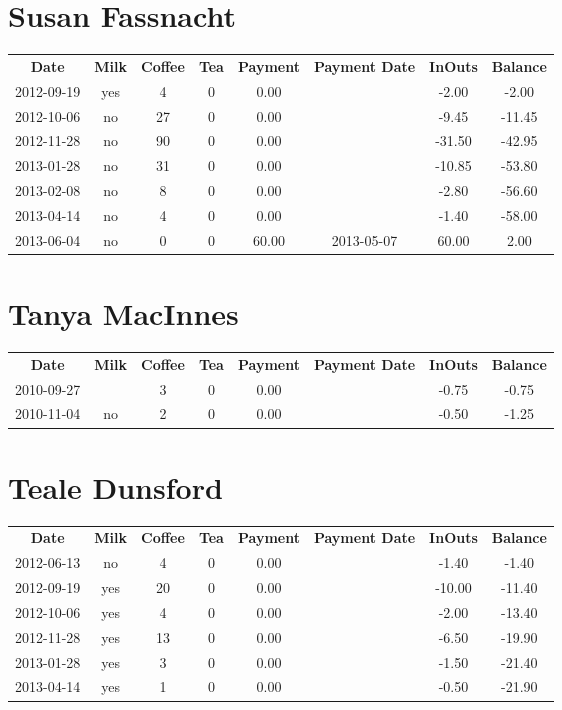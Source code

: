 \section{Susan Fassnacht}

\begin{center}
\begin{tabular}{cccccccc}
\textbf{Date} & \textbf{Milk} & \textbf{Coffee} & \textbf{Tea} & \textbf{Payment} & \textbf{Payment Date} & \textbf{InOuts} & \textbf{Balance} \\
2012-09-19 & yes &  4 & 0 &  0.00 &  &  -2.00 &  -2.00\\ 
2012-10-06 & no & 27 & 0 &  0.00 &  &  -9.45 & -11.45\\ 
2012-11-28 & no & 90 & 0 &  0.00 &  & -31.50 & -42.95\\ 
2013-01-28 & no & 31 & 0 &  0.00 &  & -10.85 & -53.80\\ 
2013-02-08 & no &  8 & 0 &  0.00 &  &  -2.80 & -56.60\\ 
2013-04-14 & no &  4 & 0 &  0.00 &  &  -1.40 & -58.00\\ 
2013-06-04 & no &  0 & 0 & 60.00 & 2013-05-07 &  60.00 &   2.00
\end{tabular}
\end{center}

\section{Tanya MacInnes}

\begin{center}
\begin{tabular}{cccccccc}
\textbf{Date} & \textbf{Milk} & \textbf{Coffee} & \textbf{Tea} & \textbf{Payment} & \textbf{Payment Date} & \textbf{InOuts} & \textbf{Balance} \\
2010-09-27 &  & 3 & 0 & 0.00 &  & -0.75 & -0.75\\ 
2010-11-04 & no & 2 & 0 & 0.00 &  & -0.50 & -1.25
\end{tabular}
\end{center}

\section{Teale Dunsford}

\begin{center}
\begin{tabular}{cccccccc}
\textbf{Date} & \textbf{Milk} & \textbf{Coffee} & \textbf{Tea} & \textbf{Payment} & \textbf{Payment Date} & \textbf{InOuts} & \textbf{Balance} \\
2012-06-13 & no &  4 & 0 & 0.00 &  &  -1.40 &  -1.40\\ 
2012-09-19 & yes & 20 & 0 & 0.00 &  & -10.00 & -11.40\\ 
2012-10-06 & yes &  4 & 0 & 0.00 &  &  -2.00 & -13.40\\ 
2012-11-28 & yes & 13 & 0 & 0.00 &  &  -6.50 & -19.90\\ 
2013-01-28 & yes &  3 & 0 & 0.00 &  &  -1.50 & -21.40\\ 
2013-04-14 & yes &  1 & 0 & 0.00 &  &  -0.50 & -21.90
\end{tabular}
\end{center}

